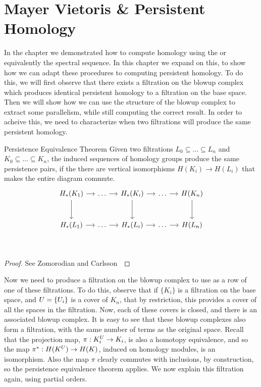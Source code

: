 \chapter{Mayer Vietoris \& Persistent Homology}
In the chapter we demonstrated how to compute homology using the \mvb{} or equivalently the \mv spectral sequence. In this chapter we expand on this, to show how we can adapt these procedures to computing persistent homology. To do this, we will first observe that there exists a filtration on the blowup complex which produces identical persistent homology to a filtration on the base space. Then we will show how we can use the structure of the blowup complex to extract some parallelism, while still computing the correct result. In order to acheive this, we need to characterize when two filtrations will produce the same persistent homology. 
\begin{theorem}{Persistence Equivalence Theorem}
    Given two filtrations $L_0 \subseteq \ldots \subseteq L_n$ and
    $K_0 \subseteq \ldots \subseteq K_n$, the induced sequences of homology
    groups produce the same persistence pairs,
    if the there are vertical isomorphisms $H(K_i) \to H(L_i)$ that makes the entire diagram commute.
\[
\begin{tikzcd}[row sep=large, column sep=small]
    H_*(K_1) \arrow{r}\arrow{d} & \ldots \arrow{r} & H_*(K_i)  \arrow{r}\arrow{d} & \ldots \arrow{r} & H(K_n) \arrow{d} \\
    H_*(L_1) \arrow{r} & \ldots \arrow{r} & H_*(L_i)  \arrow{r} & \ldots \arrow{r} & H(L_n) \\
\end{tikzcd}
\]
\end{theorem}
\begin{proof}
See Zomorodian and Carlsson~\cite{zc-cph-05}
\end{proof}
Now we need to produce a filtration on the blowup complex to use as a row of one of these filtrations. To do this, observe that if $\{K_i\}$ is a filtration on the base space, and $U =\{ U_i \}$ is a cover of $K_n$, that by restriction, this provides a cover of all the spaces in the filtration. Now, each of these covers is closed, and there is an associated blowup complex. It is easy to see that these blowup complexes also form a filtration, with the same number of terms as the original space. Recall that the projection map, $\pi: K_i^U \to K_i$, is also a homotopy equivalence, and so the map $\pi^*: H(K^U) \to H(K)$, induced on homology modules, is an isomorphism. Also the map $\pi$ clearly commutes with inclusions, by construction, so  the persistence equivalence theorem applies. We now explain this filtration again, using partial orders.

